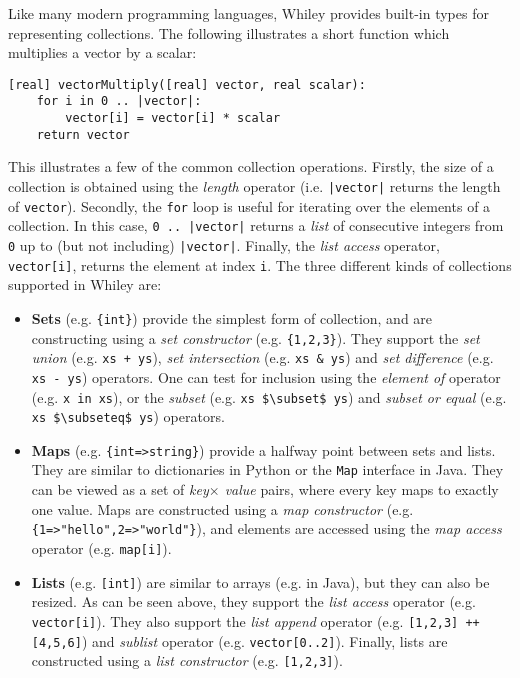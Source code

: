 Like many modern programming languages, Whiley provides built-in types
for representing collections.  The following illustrates a short
function which multiplies a vector by a scalar:
\begin{lstlisting}
[real] vectorMultiply([real] vector, real scalar):
    for i in 0 .. |vector|:
        vector[i] = vector[i] * scalar
    return vector
\end{lstlisting}
This illustrates a few of the common collection operations.  Firstly,
the size of a collection is obtained using the {\em length} operator
(i.e. \lstinline{|vector|} returns the length of \lstinline{vector}).
Secondly, the \lstinline{for} loop is useful for iterating over the
elements of a collection.  In this case, \lstinline{0 .. |vector|}
returns a {\em list} of consecutive integers from \lstinline{0} up to
(but not including) \lstinline{|vector|}.  Finally, the {\em list
  access} operator, \lstinline{vector[i]}, returns the element at
index \lstinline{i}.  The three different kinds of collections
supported in Whiley are:
\begin{itemize}
\item {\bf Sets} (e.g. \lstinline|{int}|) provide the simplest form of collection, and are constructing using a {\em set constructor} (e.g. \lstinline|{1,2,3}|).  They support the {\em set union} (e.g. \lstinline{xs + ys}), {\em set intersection} (e.g. \lstinline{xs & ys}) and {\em set difference} (e.g. \lstinline{xs - ys}) operators.  One can test for inclusion using the {\em element of} operator (e.g. \lstinline{x in xs}), or the {\em subset} (e.g. \lstinline{xs $\subset$ ys}) and {\em subset or equal} (e.g. \lstinline{xs $\subseteq$ ys}) operators.
  
\item {\bf Maps} (e.g. \lstinline|{int=>string}|) provide a halfway point between sets and lists.  They are similar to dictionaries in Python or the \lstinline{Map} interface in Java.  They can be viewed as a set of {\em key$\times$ value} pairs, where every key maps to exactly one value.  Maps are constructed using a {\em map constructor} (e.g. \lstinline|{1=>"hello",2=>"world"}|), and elements are accessed using the {\em map access} operator (e.g. \lstinline{map[i]}).  

\item {\bf Lists} (e.g. \lstinline{[int]}) are similar to arrays
  (e.g. in Java), but they can also be resized.  As can be seen above,
  they support the {\em list access} operator
  (e.g. \lstinline{vector[i]}).  They also support the {\em list
    append} operator (e.g. \lstinline{[1,2,3] ++ [4,5,6]}) and {\em
    sublist} operator (e.g. \lstinline{vector[0..2]}).  Finally, lists are constructed using a {\em list constructor} (e.g. \lstinline{[1,2,3]}).

\end{itemize}

